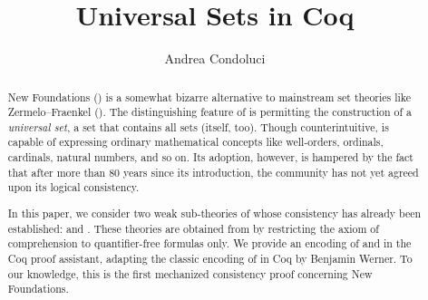 \documentclass[sigplan,10pt,anonymous,review]{acmart}%
\begin{document}
\title{Universal Sets in Coq}

\author{Andrea Condoluci}


\begin{abstract}
New Foundations (\NF) is a somewhat bizarre alternative to mainstream set theories like Zermelo–Fraenkel (\ZF). The distinguishing feature of \NF{} is permitting the construction of a \emph{universal set}, \ie{} a set that contains all sets (itself, too). Though counterintuitive, \NF{} is capable of expressing ordinary mathematical concepts like well-orders, ordinals, cardinals, natural numbers, and so on. Its adoption, however, is hampered by the fact that after more than 80 years since its introduction, the community has not yet agreed upon its logical consistency.
  
In this paper, we consider two weak sub-theories of \NF{} whose consistency has already been established: \NFTWO{} and \NFO. These theories are obtained from \NF{} by restricting the axiom of comprehension to quantifier-free formulas only. We provide an encoding of \NFTWO{} and \NFO{} in the Coq proof assistant, adapting the classic encoding of \ZF{} in Coq by Benjamin Werner. To our knowledge, this is the first mechanized consistency proof concerning New Foundations.
\end{abstract}
\end{document}
